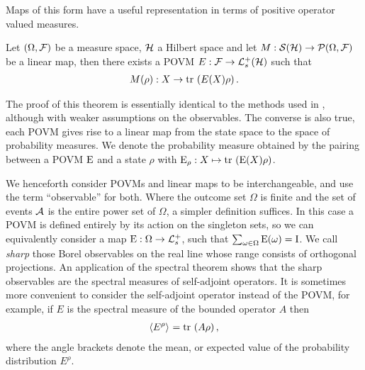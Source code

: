 Maps of this form have a useful representation in terms of positive operator valued measures.
\begin{thm}
  Let $(\Omega,\mathcal{F})$ be a measure space, $\mathcal{H}$ a Hilbert space and let $M:\dops[\hcal]\to\probs{\Omega}{\fcal}$ be a linear map, then there exists a POVM $E:\fcal\to\posops[\hcal]$ such that
  \begin{align}
    M(\rho):X\to \tr{E(X)\rho}.
  \end{align}
\end{thm}
The proof of this theorem is essentially identical to the methods used in \cite{Neumann1927}, although with weaker assumptions on the observables. The converse is also true, each POVM gives rise to a linear map from the state space to the space of probability measures. We denote the probability measure obtained by the pairing between a POVM $\operatorname{E}$ and a state $\rho$ with $\ope_\rho:X\mapsto \tr{\ope(X)\rho}$.

We henceforth consider POVMs and linear maps to be interchangeable, and use the term ``observable'' for both. Where the outcome set $\Omega$ is finite and the set of events $\mathcal{A}$ is the entire power set of $\Omega$, a simpler definition suffices. In this case a POVM is defined entirely by its action on the singleton sets, so we can equivalently consider a map $\ope:\Omega\to\posops$, such that $\sum_{\omega\in\Omega} \operatorname{E}(\omega) = \operatorname{I}$. 
We call \emph{sharp} those Borel observables on the real line whose range consists of orthogonal projections. An application of the spectral theorem shows that the sharp observables are the spectral measures of self-adjoint operators. It is sometimes more convenient to consider the self-adjoint operator instead of the POVM, for example, if $E$ is the spectral measure of the bounded operator $A$ then
\begin{align}
  \expe{E^\rho}{} = \tr{A\rho},
\end{align}
where the angle brackets denote the mean, or expected value of the probability distribution $E^\rho$.  

